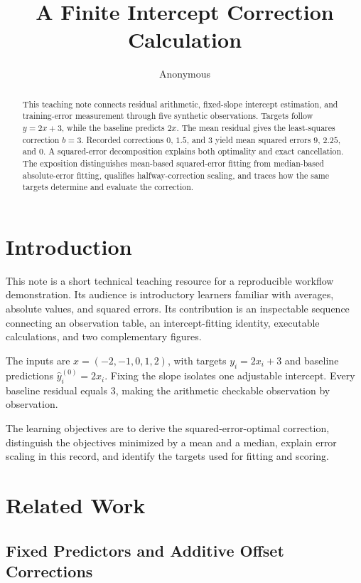 \documentclass[11pt]{article}
\title{A Finite Intercept Correction Calculation}
\author{Anonymous}
\date{}
\begin{document}
\maketitle

\begin{abstract}
This teaching note connects residual arithmetic, fixed-slope intercept estimation, and training-error measurement through five synthetic observations. Targets follow $y=2x+3$, while the baseline predicts $2x$. The mean residual gives the least-squares correction $b=3$. Recorded corrections $0$, $1.5$, and $3$ yield mean squared errors $9$, $2.25$, and $0$. A squared-error decomposition explains both optimality and exact cancellation. The exposition distinguishes mean-based squared-error fitting from median-based absolute-error fitting, qualifies halfway-correction scaling, and traces how the same targets determine and evaluate the correction.
\end{abstract}

\section{Introduction}

This note is a short technical teaching resource for a reproducible workflow demonstration. Its audience is introductory learners familiar with averages, absolute values, and squared errors. Its contribution is an inspectable sequence connecting an observation table, an intercept-fitting identity, executable calculations, and two complementary figures.

The inputs are $x=(-2,-1,0,1,2)$, with targets $y_i=2x_i+3$ and baseline predictions $\hat y_i^{(0)}=2x_i$. Fixing the slope isolates one adjustable intercept. Every baseline residual equals $3$, making the arithmetic checkable observation by observation.

The learning objectives are to derive the squared-error-optimal correction, distinguish the objectives minimized by a mean and a median, explain error scaling in this record, and identify the targets used for fitting and scoring.

\section{Related Work}

\subsection{Fixed Predictors and Additive Offset Corrections}
\end{document}
